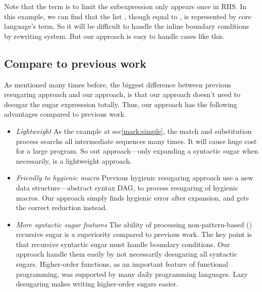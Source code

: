 Note that the  term is to limit the subexpression only appears once in RHS. In this example, we can find that the list , though equal to , is represented by core language's term. So it will be difficult to handle the inline boundary conditions by rewriting system. But our approach is easy to handle cases like this.

\subsection{Compare to previous work}

As mentioned many times before, the biggest difference between previous resugaring approach and our approach, is that our approach doesn't need to desugar the sugar expresssion totally. Thus, our approach has the following advantages compared to previous work.

\begin{itemize}
	\item \emph{Lightweight} As the example at sec\ref{mark:simple}, the match and substitution process searchs all intermediate sequences many times. It will cause huge cost for a large program. So out approach---only expanding a syntactic sugar when necessarily, is a lightweight approach.
	\item \emph{Friendly to hygienic macro} Previous hygienic resugaring approach use a new data structure---abstract syntax DAG, to process resugaring of hygienic macros. Our approach simply finds hygienic error after expansion, and gets the correct reduction instead.
	\item \emph{More syntactic sugar features} The ability of processing non-pattern-based () recursive sugar is a superiority compared to previous work. The key point is that recursive syntactic sugar must handle boundary conditions. Our approach handle them easily by not necessarily desugaring all syntactic sugars. Higher-order functions, as an important feature of functional programming, was supported by many daily programming languages. Lazy desugaring makes writing higher-order sugars easier.
\end{itemize}

